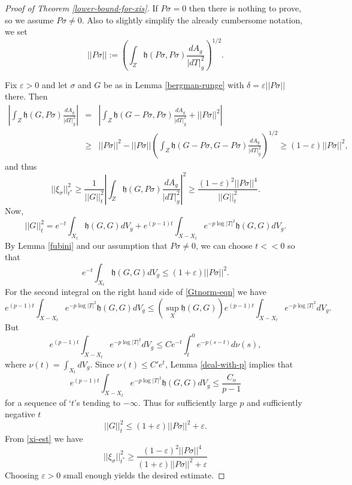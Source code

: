 \documentclass[12pt,hidelinks]{amsart}
\newcommand{\fh}{{\mathfrak h}}
\newcommand{\ve}{\varepsilon}
\begin{document}
\begin{proof}[Proof of Theorem \ref{lower-bound-for-xis}]
If $P\sigma = 0$ then there is nothing to prove, so we assume $P\sigma \neq 0$.  Also to slightly simplify the already cumbersome notation, we set 
\[
||P\sigma|| := \left ( \int _Z \fh (P\sigma,P\sigma) \frac{dA_g}{|dT|^2_g} \right ) ^{1/2}.
\]

Fix $\ve > 0$ and let $\sigma$ and $G$ be as in Lemma \ref{bergman-runge} with $\delta = \ve ||P\sigma||$ there.  Then
\begin{eqnarray*}
\left | \int _Z \fh (G,P\sigma) \frac{dA_g}{|dT|^2_g} \right | &=& \left | \int _Z \fh (G- P\sigma,P\sigma) \frac{dA_g}{|dT|^2_g}  + ||P\sigma||^2 \right | \\
&\ge& ||P\sigma||^2 - ||P\sigma|| \left (\int _Z  \fh( G - P\sigma, G-P\sigma)\frac{dA_{g}}{|dT|^2_g} \right )^{1/2} \ge (1- \ve)||P\sigma||^2,
\end{eqnarray*}
and thus 
\begin{equation}\label{xi-est}
||\xi _\sigma||^2_{t^*} \ge \frac{1}{||G||^2_t} \left | \int _Z \fh (G ,P\sigma)\frac{dA_{g}}{|dT|^2_{g}}\right |^2 \ge \frac{(1 - \ve)^2 ||P\sigma||^4}{||G||^2_t}.
\end{equation}
Now, 
\begin{equation}\label{Gtnorm-eqn}
||G||^2_t = e^{-t}\int _{X_t} \fh (G,G)dV_{g} + e^{(p-1)t }\int _{X-X_t}e^{-p\log |T|^2}\fh(G,G)dV_{g}.
\end{equation}
By Lemma \ref{fubini} and our assumption that $P\sigma \neq 0$, we can choose $t << 0$ so that 
\[
e^{-t}\int _{X_t} \fh(G,G)dV_{g}\le  (1+ \ve)||P\sigma||^2.
\]
For the second integral on the right hand side of \eqref{Gtnorm-eqn} we have
\[
e^{(p-1)t}\int _{X-X_t} e^{-p\log |T|^2}\fh(G,G) dV_{g} \le \left ( \sup _X \fh(G,G)\right ) e^{(p-1)t} \int _{X-X_t} e^{-p \log |T|^2} dV_{g}.
\]
But 
\[
e^{(p-1)t} \int _{X-X_t} e^{-p\log |T|^2} dV_{g} \le C  e^{-t} \int _t ^0  e^{-p(s-t)}d\nu (s), 
\]
where $\nu (t) = \int _{X_t}dV_{g}$.  Since $\nu (t) \le C' e^t$, Lemma \ref{deal-with-p} implies that 
\[
e^{(p-1)t }\int _{X-X_t} e^{-p\log |T|^2}\fh(G,G) dV_g  \le \frac{C_o}{p-1}
\]
for a sequence of `$t$'s tending to $-\infty$.  Thus for sufficiently large $p$ and sufficiently negative $t$ 
\[
||G||^2_t  \le (1+ \ve)||P\sigma||^2 + \ve.
\]
From \eqref{xi-est} we have 
\[
||\xi _\sigma||^2_{t^*} \ge \frac{(1-\ve)^2||P\sigma||^4}{(1+\ve)||P\sigma||^2 + \ve}
\]
Choosing $\ve > 0$ small enough yields the desired estimate.
\end{proof}
\end{document}

